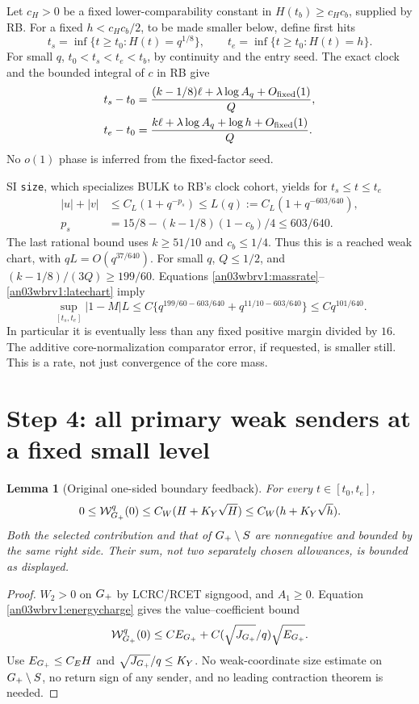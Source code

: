 \documentclass[11pt]{article}
\numberwithin{equation}{section}
\newtheorem{lemma}[theorem]{Lemma}
\theoremstyle{remark}\newtheorem{remark}[theorem]{Remark}
\begin{document}
Let $c_H>0$ be a fixed lower-comparability constant in
$H(t_b)\ge c_Hc_b$, supplied by RB. For a fixed $h<c_Hc_b/2$,
to be made smaller below, define first hits
\begin{equation}
 t_s=\inf\{t\ge t_0:H(t)=q^{1/8}\},\qquad
 t_e=\inf\{t\ge t_0:H(t)=h\}.
 \label{an03wbrv1:levels}
\end{equation}
For small $q$, $t_0<t_s<t_e<t_b$, by continuity and the entry
seed. The exact clock and the bounded integral of $c$ in RB give
\begin{align}
 t_s-t_0&=\frac{(k-1/8)\ell+\lambda\log A_q+O_{\rm fixed}(1)}Q,
 \nonumber\\
 t_e-t_0&=\frac{k\ell+\lambda\log A_q+\log h+O_{\rm fixed}(1)}Q.
 \label{an03wbrv1:times}
\end{align}
No $o(1)$ phase is inferred from the fixed-factor seed.

SI \texttt{size}, which specializes BULK to RB's clock cohort, yields
for $t_s\le t\le t_e$
\begin{align}
 |u|+|v|&\le C_L(1+q^{-p_s})\le L(q):=C_L(1+q^{-603/640}),
 \nonumber\\
 p_s&=15/8-(k-1/8)(1-c_b)/4\le603/640.
 \label{an03wbrv1:latechart}
\end{align}
The last rational bound uses $k\ge51/10$ and $c_b\le1/4$.
Thus this is a reached weak chart, with $qL=O(q^{37/640})$.
For small $q$, $Q\le1/2$, and
$(k-1/8)/(3Q)\ge199/60$. Equations
\eqref{an03wbrv1:massrate}--\eqref{an03wbrv1:latechart} imply
\begin{equation}
 \sup_{[t_s,t_e]}|1-M|L
 \le C\{q^{199/60-603/640}+q^{11/10-603/640}\}
 \le Cq^{101/640}.
 \label{an03wbrv1:massproduct}
\end{equation}
In particular it is eventually less than any fixed positive margin
divided by $16$. The additive core-normalization comparator error,
if requested, is smaller still. This is a rate, not just convergence
of the core mass.

\section{Step 4: all primary weak senders at a fixed small level}
\begin{lemma}[Original one-sided boundary feedback]
\label{an03wbrv1:weakvalue}
For every $t\in[t_0,t_e]$,
\begin{equation}
 0\le\mathcal W_{G_+}^q(0)\le C_W(H+K_Y\sqrt H)
                    \le C_W(h+K_Y\sqrt h).
 \label{an03wbrv1:Wbudget}
\end{equation}
Both the selected contribution and that of ${G_+}\setminus S$ are
nonnegative and bounded by the same right side. Their sum, not two
separately chosen allowances, is bounded as displayed.
\end{lemma}
\begin{proof}
$W_2>0$ on ${G_+}$ by LCRC/RCET signgood, and $A_1\ge0$.
Equation \eqref{an03wbrv1:energycharge} gives the value--coefficient
bound
\[
 \mathcal W_{G_+}^q(0)\le C E_{G_+}+
       C(\sqrt{J_{G_+}}/q)\sqrt{E_{G_+}}.
\]
Use $E_{G_+}\le C_EH$ and $\sqrt{J_{G_+}}/q\le K_Y$.
No weak-coordinate size estimate on ${G_+}\setminus S$, no return
sign of any sender, and no leading contraction theorem is needed.
\end{proof}
\end{document}
